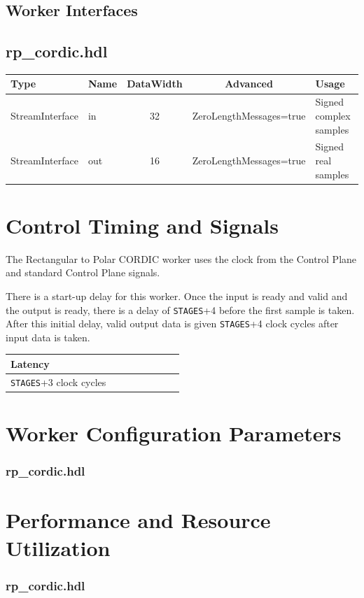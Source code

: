 \documentclass{article}
\def\comp{rp\_cordic}
\edef\ecomp{rp_cordic}
\begin{document}
\begin{landscape}
	\section*{Worker Interfaces}
	\subsection*{\comp.hdl}
	\begin{scriptsize}
		\begin{tabular}{|M{2cm}|M{1.5cm}|c|c|M{12cm}|}
			\hline
			Type            & Name & DataWidth & Advanced                & Usage                  \\
			\hline
			StreamInterface & in   & 32        & ZeroLengthMessages=true & Signed complex samples \\
			\hline
			StreamInterface & out  & 16        & ZeroLengthMessages=true & Signed real samples    \\
			\hline
		\end{tabular}
	\end{scriptsize}
\end{landscape}

\section*{Control Timing and Signals}
The Rectangular to Polar CORDIC worker uses the clock from the Control Plane and standard Control Plane signals.

\noindent There is a start-up delay for this worker. Once the input is ready and valid and the output is ready, there is a delay of \verb+STAGES++4 before the first sample is taken. After this initial delay, valid output data is given \verb+STAGES++4 clock cycles after input data is taken.\medskip

\begin{tabular}{|M{4.5cm}|M{1cm}|M{1cm}|M{1.5cm}|M{2cm}|M{1cm}|M{1cm}|M{2.5cm}|}
	\hline
	Latency                      \\
	\hline
	\verb+STAGES++3 clock cycles \\
	\hline
\end{tabular}

\begin{landscape}
\section*{Worker Configuration Parameters}
\subsubsection*{\comp.hdl}

\section*{Performance and Resource Utilization}
\subsubsection*{\comp.hdl}

\end{landscape}
\end{document}

